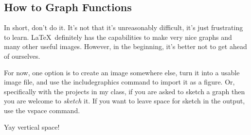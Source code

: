 \documentclass{article}
\begin{document}
\subsection{How to Graph Functions}


In short, don't do it.  It's not that it's unreasonably difficult, it's just frustrating to learn.  \LaTeX\ definitely has the capabilities to make very nice graphs and many other useful images.  However, in the beginning, it's better not to get ahead of ourselves.

For now, one option is to create an image somewhere else, turn it into a usable image file, and use the includegraphics command to import it as a figure.  Or, specifically with the projects in my class, if you are asked to sketch a graph then you are welcome to \emph{sketch} it.  If you want to leave space for sketch in the output, use the vspace command.

\vspace{1in}

Yay vertical space!

\end{document}
